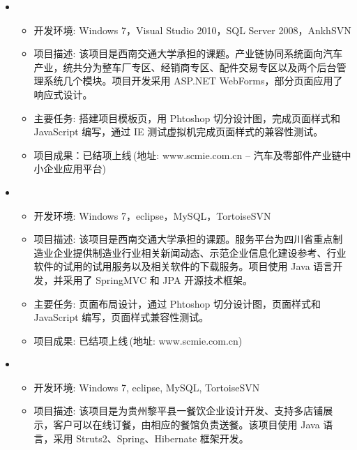 \documentclass[letterpaper,11pt]{article}
\begin{document}
  \begin{itemize}[leftmargin=*]
    \item
      {\footnotesize
      \begin{itemize}
        \item 开发环境: Windows 7，Visual Studio 2010，SQL Server 2008，AnkhSVN
        \item 项目描述: 该项目是西南交通大学承担的课题。产业链协同系统面向汽车产业，统共分为整车厂专区、经销商专区、配件交易专区以及两个后台管理系统几个模块。项目开发采用 ASP.NET WebForms，部分页面应用了响应式设计。
        \item 主要任务: 搭建项目模板页，用 Phtoshop 切分设计图，完成页面样式和 JavaScript 编写，通过 IE 测试虚拟机完成页面样式的兼容性测试。
        \item 项目成果：已结项上线$\,$(地址: www.scmie.com.cn -- 汽车及零部件产业链中小企业应用平台)
      \end{itemize}
      }
    \item
      {\footnotesize
      \begin{itemize}
        \item 开发环境: Windows 7，eclipse，MySQL，TortoiseSVN
        \item 项目描述: 该项目是西南交通大学承担的课题。服务平台为四川省重点制造业企业提供制造业行业相关新闻动态、示范企业信息化建设参考、行业软件的试用的试用服务以及相关软件的下载服务。项目使用 Java 语言开发，并采用了 SpringMVC 和 JPA 开源技术框架。
        \item 主要任务: 页面布局设计，通过 Phtoshop 切分设计图，页面样式和 JavaScript 编写，页面样式兼容性测试。
        \item 项目成果: 已结项上线$\,$(地址: www.scmie.com.cn)
      \end{itemize}
      }
    \item
    {\footnotesize
    \begin{itemize}
      \item 开发环境: Windows 7, eclipse, MySQL, TortoiseSVN
      \item 项目描述: 该项目是为贵州黎平县一餐饮企业设计开发、支持多店铺展示，客户可以在线订餐，由相应的餐馆负责送餐。该项目使用 Java 语言，采用 Struts2、Spring、Hibernate 框架开发。

\end{itemize}}
\end{itemize}
\end{document}

